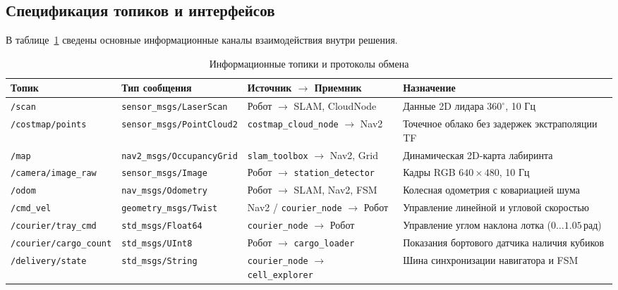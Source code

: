 \documentclass[a4paper,11pt]{article}
\begin{document}
\vspace{-0.4cm}

\subsection{Спецификация топиков и интерфейсов}
В таблице~\ref{tab:ros2_topics} сведены основные информационные каналы взаимодействия внутри решения.

\begin{table}[H]
\centering
\small
\begin{tabularx}{\textwidth}{p{3.6cm}p{4.6cm}p{3.2cm}X}
\toprule
\textbf{Топик} & \textbf{Тип сообщения} & \textbf{Источник $\to$ Приемник} & \textbf{Назначение} \\
\midrule
\texttt{/scan} & \texttt{sensor\_msgs/LaserScan} & Робот $\to$ SLAM, CloudNode & Данные 2D лидара $360^\circ$, 10 Гц \\
\texttt{/costmap/points} & \texttt{sensor\_msgs/PointCloud2} & \texttt{costmap\_cloud\_node} $\to$ Nav2 & Точечное облако без задержек экстраполяции TF \\
\texttt{/map} & \texttt{nav2\_msgs/OccupancyGrid} & \texttt{slam\_toolbox} $\to$ Nav2, Grid & Динамическая 2D-карта лабиринта \\
\texttt{/camera/image\_raw} & \texttt{sensor\_msgs/Image} & Робот $\to$ \texttt{station\_detector} & Кадры RGB $640 \times 480$, 10 Гц \\
\texttt{/odom} & \texttt{nav\_msgs/Odometry} & Робот $\to$ SLAM, Nav2, FSM & Колесная одометрия с ковариацией шума \\
\texttt{/cmd\_vel} & \texttt{geometry\_msgs/Twist} & Nav2 / \texttt{courier\_node} $\to$ Робот & Управление линейной и угловой скоростью \\
\texttt{/courier/tray\_cmd} & \texttt{std\_msgs/Float64} & \texttt{courier\_node} $\to$ Робот & Управление углом наклона лотка ($0\dots1.05$\,рад) \\
\texttt{/courier/cargo\_count} & \texttt{std\_msgs/UInt8} & Робот $\to$ \texttt{cargo\_loader} & Показания бортового датчика наличия кубиков \\
\texttt{/delivery/state} & \texttt{std\_msgs/String} & \texttt{courier\_node} $\to$ \texttt{cell\_explorer} & Шина синхронизации навигатора и FSM \\
\bottomrule
\end{tabularx}
\caption{Информационные топики и протоколы обмена}
\label{tab:ros2_topics}
\end{table}
\end{document}
